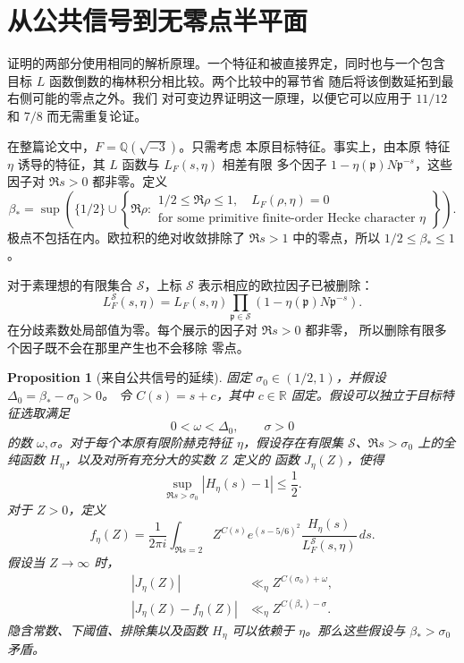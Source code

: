 \documentclass[11pt,a4paper]{article}
\numberwithin{equation}{section}
\numberwithin{figure}{section}
\newtheorem{proposition}[theorem]{Proposition}
\theoremstyle{definition}
\theoremstyle{remark}
\begin{document}
\section{从公共信号到无零点半平面}
\label{sec:analytic-reduction}

证明的两部分使用相同的解析原理。一个特征和被直接界定，同时也与一个包含
目标 $L$ 函数倒数的梅林积分相比较。两个比较中的幂节省
随后将该倒数延拓到最右侧可能的零点之外。我们
对可变边界证明这一原理，以便它可以应用于
$11/12$ 和 $7/8$ 而无需重复论证。

在整篇论文中，$F=\mathbb Q(\sqrt{-3})$。只需考虑
本原目标特征。事实上，由本原
特征 $\eta$ 诱导的特征，其 $L$ 函数与 $L_F(s,\eta)$ 相差有限
多个因子 $1-\eta(\mathfrak p)N\mathfrak p^{-s}$，这些因子对
$\Re s>0$ 都非零。定义
\begin{equation}
 \beta_* = \sup\left(\{1/2\}\cup
 \left\{\Re\rho:\begin{array}{l}
  1/2\le\Re\rho\le1,\quad L_F(\rho,\eta)=0\\
  \text{for some primitive finite-order Hecke character }\eta
 \end{array}\right\}\right).
 \label{old-eq:1.1b}
\end{equation}
极点不包括在内。欧拉积的绝对收敛排除了
$\Re s>1$ 中的零点，所以 $1/2\le\beta_*\le1$。

对于素理想的有限集合 $\mathcal S$，上标 $\mathcal S$
表示相应的欧拉因子已被删除：
\[
 L_F^{\mathcal S}(s,\eta)
 =L_F(s,\eta)\prod_{\mathfrak p\in\mathcal S}
       (1-\eta(\mathfrak p)N\mathfrak p^{-s}).
\]
在分歧素数处局部值为零。每个展示的因子对 $\Re s>0$ 都非零，
所以删除有限多个因子既不会在那里产生也不会移除
零点。\begin{proposition}[来自公共信号的延续]
\label{lem:continuation-criterion}
固定 $\sigma_0\in(1/2,1)$，并假设 $\Delta_0=\beta_*-\sigma_0>0$。
令 $C(s)=s+c$，其中 $c\in\mathbb R$ 固定。假设可以独立于目标特征选取满足
\[
 0<\omega<\Delta_0,\qquad \sigma>0
\]
的数 $\omega,\sigma$。对于每个本原有限阶赫克特征 $\eta$，假设存在有限集
$\mathcal S$、$\Re s>\sigma_0$ 上的全纯函数 $H_\eta$，以及对所有充分大的实数 $Z$ 定义的
函数 $J_\eta(Z)$，使得
\begin{equation}
 \sup_{\Re s>\sigma_0}|H_\eta(s)-1|\le\frac12.
 \label{eq:signal-euler-contract}
\end{equation}
对于 $Z>0$，定义
\begin{equation}
 f_\eta(Z)=\frac1{2\pi i}\int_{\Re s=2}
 Z^{C(s)}e^{(s-5/6)^2}
 \frac{H_\eta(s)}{L_F^{\mathcal S}(s,\eta)}\,ds.
 \label{eq:common-residue}
\end{equation}
假设当 $Z\to\infty$ 时，
\begin{align}
 |J_\eta(Z)|&\ll_\eta Z^{C(\sigma_0)+\omega},
       \label{eq:low-probe-contract}\\
 |J_\eta(Z)-f_\eta(Z)|&\ll_\eta Z^{C(\beta_*)-\sigma}.
       \label{eq:high-probe-contract}
\end{align}
隐含常数、下阈值、排除集以及函数 $H_\eta$
可以依赖于 $\eta$。那么这些假设与 $\beta_*>\sigma_0$ 矛盾。
\end{proposition}
\end{document}
